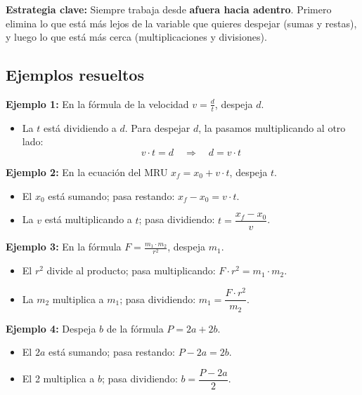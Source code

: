 \documentclass[12pt, letterpaper]{article}
\begin{document}
\begin{cuadroadvertencia}
  \textbf{Estrategia clave:} Siempre trabaja desde \textbf{afuera hacia adentro}. Primero elimina lo que está más lejos de la variable que quieres despejar (sumas y restas), y luego lo que está más cerca (multiplicaciones y divisiones).
\end{cuadroadvertencia}

\subsection{Ejemplos resueltos}

\noindent\textbf{Ejemplo 1:} En la fórmula de la velocidad $v = \frac{d}{t}$, despeja $d$.
\begin{itemize}
  \item La $t$ está dividiendo a $d$. Para despejar $d$, la pasamos multiplicando al otro lado:
        $$v \cdot t = d \quad \Longrightarrow \quad d = v \cdot t$$
\end{itemize}

\noindent\textbf{Ejemplo 2:} En la ecuación del MRU $x_f = x_0 + v \cdot t$, despeja $t$.
\begin{itemize}
  \item El $x_0$ está sumando; pasa restando: $x_f - x_0 = v \cdot t$.
  \item La $v$ está multiplicando a $t$; pasa dividiendo: $t = \dfrac{x_f - x_0}{v}$.
\end{itemize}

\noindent\textbf{Ejemplo 3:} En la fórmula $F = \frac{m_1 \cdot m_2}{r^2}$, despeja $m_1$.
\begin{itemize}
  \item El $r^2$ divide al producto; pasa multiplicando: $F \cdot r^2 = m_1 \cdot m_2$.
  \item La $m_2$ multiplica a $m_1$; pasa dividiendo: $m_1 = \dfrac{F \cdot r^2}{m_2}$.
\end{itemize}

\noindent\textbf{Ejemplo 4:} Despeja $b$ de la fórmula $P = 2a + 2b$.
\begin{itemize}
  \item El $2a$ está sumando; pasa restando: $P - 2a = 2b$.
  \item El 2 multiplica a $b$; pasa dividiendo: $b = \dfrac{P - 2a}{2}$.
\end{itemize}


\end{document}
